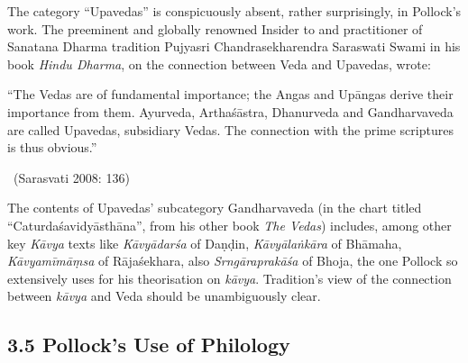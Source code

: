 \vskip -5pt

The category “Upavedas” is conspicuously absent, rather surprisingly, in Pollock’s work. The preeminent and globally renowned Insider to and practitioner of Sanatana Dharma tradition Pujyasri Chandrasekha\-rendra Saraswati Swami in his book \textit{Hindu Dharma}, on the connection between Veda and Upavedas, wrote:

\begin{myquote}
“The Vedas are of fundamental importance; the Angas and Upāngas derive their importance from them. Ayurveda, Arthaśāstra, Dhanurveda and Gandharvaveda are called Upavedas, subsidiary Vedas. The connection with the prime scriptures is thus obvious.” 

~\hfill (Sarasvati 2008: 136)
\end{myquote}

The contents of Upavedas’ subcategory Gandharvaveda (in the chart titled “Caturdaśavidyāsthāna”, from his other book \textit{The Vedas}) includes, among other key \textit{Kāvya} texts like \textit{Kāvyādarśa} of Daṇḍin, \textit{Kāvyālaṅkāra} of Bhāmaha, \textit{Kāvyamīmāṃsa} of Rājaśekhara, also \textit{Srngāraprakāśa} of Bhoja, the one Pollock so extensively uses for his theorisation on \textit{kāvya}. Tradition’s view of the connection between \textit{kāvya} and Veda should be unambiguously clear.


\subsection*{3.5 Pollock’s Use of Philology}

\vskip -5pt

